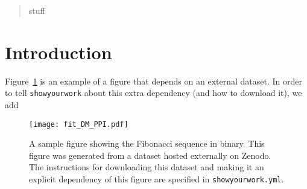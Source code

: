 \documentclass[twocolumn,twocolappendix,trackchanges]{aastex63}
\begin{document}
\graphicspath{{./figures/}}

\begin{abstract}
  stuff
\end{abstract}

\section{Introduction}

Figure~\ref{fig:fit_DM_PPI} is an example of a figure that depends on an external dataset.
In order to tell \texttt{showyourwork} about this extra dependency (and how to download it), we add %

\begin{figure}[ht!]
    \begin{centering}
        \texttt{[image: fit\_DM\_PPI.pdf]}
        \caption{A sample figure showing the Fibonacci sequence in binary.
            This figure was generated from a dataset hosted externally on Zenodo.
            The instructions for downloading this dataset and making it an explicit dependency of this figure are specified in \texttt{showyourwork.yml}.}
        \label{fig:fit_DM_PPI}
    \end{centering}
\end{figure}
\end{document}
